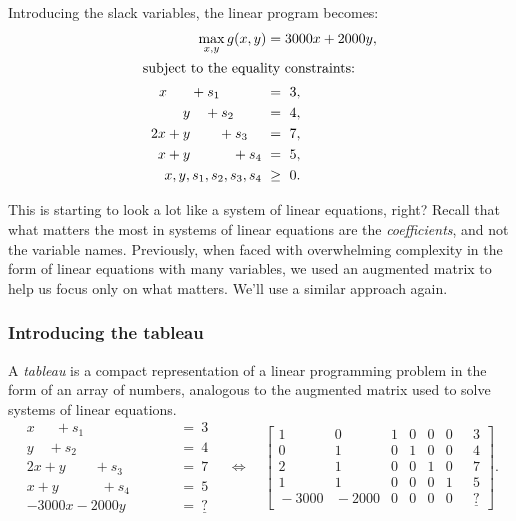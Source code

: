 \documentclass[11pt,oneside]{article}
\begin{document}
		Introducing the slack variables, the linear program becomes:
		\begin{align*}
			\qquad \qquad   \max_{x,y} 	g(x,y) &= 3000x + 2000y, 	\\  
		\intertext{subject to the equality constraints:}
					x 	\ \ \quad	+s_1 \quad \quad \quad	\ &=	\ 3,	\\
						y       \quad +s_2 \quad \quad   		\ &= 	\ 4,	\\
					2x	+ y	\quad \quad + s_3 \quad 		\ &= 	\ 7,	\\
					x 	+ y	\quad \quad \quad + s_4  		\ &= 	\ 5,	\\
						x,y,s_1,s_2,s_3,s_4				\ &\geq \	0. \\
		\end{align*}	
		
		\noindent
		This is starting to look a lot like a system of linear equations, right?
		Recall that what matters the most in systems of linear equations are the \emph{coefficients},
		and not the variable names. 
		Previously, 
		when faced with overwhelming complexity in the form of linear equations with many variables, 
		we used an augmented matrix to help us focus only on what matters.
		We'll use a similar approach again.


	\subsubsection{Introducing the tableau}

		A \emph{tableau} is a compact representation of a linear programming problem in the form of an array of numbers, 
		analogous to the augmented matrix used to solve systems of linear equations.
		{\footnotesize
		\[
			\begin{array}{rl}
					x \ \ \quad	+s_1 \quad \quad \quad		\ &=	\ 3	\\
						y       \quad +s_2 \quad \quad   		\ &= 	\ 4	\\
					2x	+ y	 \quad \quad + s_3 \quad		\ &= 	\ 7	\\
					x 	+ y	\quad \quad \quad + s_4  		\ &= 	\ 5	\\
		        - 3000x  -   2000y   \quad \quad \ \ \, 	\	\ &= \ \underline{?}
			\end{array} 
			\quad
			\Leftrightarrow
			\quad
			\left[
			\begin{array}{rrrrrr|r}
				    1&     0& 1& 0& 0& 0 \ \ & \ 3     \\ 
				    0&     1& 0& 1& 0& 0 \ \ & \  4     \\ 
				    2&     1& 0& 0& 1& 0 \ \ & \  7     \\ 
				    1&     1& 0& 0& 0& 1\ \ & \  5    \\ 
				\!\!\!-3000& \!\!\!\!-2000& 0& 0& 0& 0 \ \ & \  \underline{?}
			\end{array}
			\right]\!.
		\]}%
		
\end{document}
